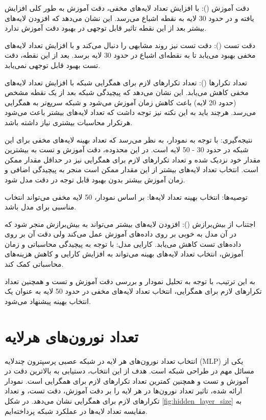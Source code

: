\documentclass[12pt, dvipsnames, svgnames, x11names,]{article}
\begin{document}
		
		دقت آموزش (): با افزایش تعداد لایه‌های مخفی، دقت آموزش به طور کلی افزایش یافته و در حدود 30 لایه به نقطه اشباع می‌رسد. این نشان می‌دهد که افزودن لایه‌های بیشتر بعد از این نقطه تاثیر قابل توجهی در بهبود دقت آموزش ندارد.
		
		
		دقت تست (): دقت تست نیز روند مشابهی را دنبال می‌کند و با افزایش تعداد لایه‌های مخفی بهبود می‌یابد تا به نقطه‌ای اشباع در حدود 30 لایه برسد. بعد از این نقطه، دقت تست بهبود قابل توجهی نمی‌یابد.
		
		
		تعداد تکرارها (): تعداد تکرارهای لازم برای همگرایی شبکه با افزایش تعداد لایه‌های مخفی کاهش می‌یابد. این نشان می‌دهد که پیچیدگی شبکه بعد از یک نقطه مشخص (حدود 20 لایه) باعث کاهش زمان آموزش می‌شود و شبکه سریع‌تر به همگرایی می‌رسد. هرچند باید به این نکته نیز توجه داشت که تعداد لایه‌های بیشتر باعث می‌شود هرتکرار محاسبات بیشتری نیاز داشته باشد.
		
		
		نتیجه‌گیری:
		با توجه به نمودار، به نظر می‌رسد که تعداد بهینه لایه‌های مخفی برای این شبکه در حدود 30 - 50 لایه است. در این محدوده، دقت آموزش و تست به بیشترین مقدار خود نزدیک شده و تعداد تکرارهای لازم برای همگرایی نیز در حداقل مقدار ممکن است. انتخاب تعداد لایه‌های بیشتر از این مقدار ممکن است منجر به پیچیدگی اضافی و زمان آموزش بیشتر بدون بهبود قابل توجه در دقت مدل شود.
		
		توصیه‌ها:
		انتخاب بهینه تعداد لایه‌ها: بر اساس نمودار، 50 لایه مخفی می‌تواند انتخاب مناسبی برای مدل  باشد.
		
		
		اجتناب از بیش‌برازش (): افزودن لایه‌های بیشتر می‌تواند به بیش‌برازش منجر شود که در آن مدل به خوبی بر روی داده‌های آموزش عمل می‌کند ولی دقت آن بر روی داده‌های تست کاهش می‌یابد.
		کارایی مدل: با توجه به پیچیدگی محاسباتی و زمان آموزش، انتخاب تعداد لایه‌های بهینه می‌تواند به افزایش کارایی و کاهش هزینه‌های محاسباتی کمک کند.
		
		
		به این ترتیب، با توجه به تحلیل نمودار و بررسی دقت آموزش و تست و همچنین تعداد تکرارهای لازم برای همگرایی، انتخاب تعداد لایه‌های مخفی در حدود 50 لایه به عنوان یک انتخاب بهینه پیشنهاد می‌شود.
	
	
	\section{تعداد نورون‌های هرلایه}
		
		انتخاب تعداد نورون‌های هر لایه در شبکه عصبی پرسپترون چندلایه (MLP) یکی از مسائل مهم در طراحی شبکه است. هدف از این انتخاب، دستیابی به بالاترین دقت در آموزش و تست و همچنین کمترین تعداد تکرارهای لازم برای همگرایی است. نمودار ارائه شده، تاثیر تعداد نورون‌ها در هر لایه را بر دقت آموزش، دقت تست، و تعداد تکرارهای لازم برای همگرایی نشان می‌دهد. در شکل \ref{fig:hidden_layer_size} به مقایسه تعداد لایه‌ها در عملکرد شبکه پرداخته‌ایم.
				
\end{document}
